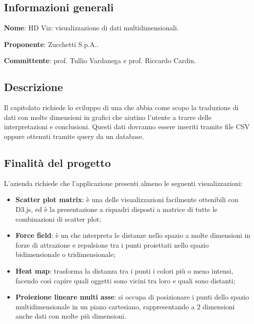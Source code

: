 \documentclass[../studio-di-fattibilita.tex]{subfiles}
\begin{document}
\subsection{Informazioni generali}%
\label{sub:c4_informazioni_generale}
\begin{description}
  \item \textbf{Nome}: HD Viz: visualizzazione di dati multidimensionali.
  \item \textbf{Proponente}: Zucchetti S.p.A..
  \item \textbf{Committente}: prof. Tullio Vardanega e prof. Riccardo Cardin.
\end{description}

\subsection{Descrizione}%
\label{sub:c4_descrizione}
Il capitolato richiede lo sviluppo di una  che abbia come scopo la 
traduzione di dati con molte dimensioni in grafici che aiutino l’utente a trarre delle interpretazioni e conclusioni. Questi dati dovranno essere inseriti tramite file CSV oppure ottenuti tramite query da un database.

\subsection{Finalità del progetto}%
\label{sub:c4_finalita_del_progetto}
L’azienda richiede che l’applicazione presenti almeno le seguenti visualizzazioni:
\begin{itemize}
  \item \textbf{Scatter plot matrix}: è una delle visualizzazioni facilmente ottenibili con D3.js, ed è la presentazione a riquadri disposti a matrice di tutte le combinazioni di scatter plot;
  \item \textbf{Force field}: è un  che interpreta le distanze nello spazio a molte dimensioni in forze di attrazione e repulsione tra i punti proiettati nello spazio bidimensionale o tridimensionale;
  \item \textbf{Heat map}: trasforma la distanza tra i punti i colori più o meno intensi, facendo così capire quali oggetti sono vicini tra loro e quali sono distanti;
  \item \textbf{Proiezione lineare multi asse}: si occupa di posizionare i punti dello spazio multidimensionale in un piano cartesiano, rappresentando a 2 dimensioni anche dati con molte più dimensioni. 
\end{itemize}
\end{document}

